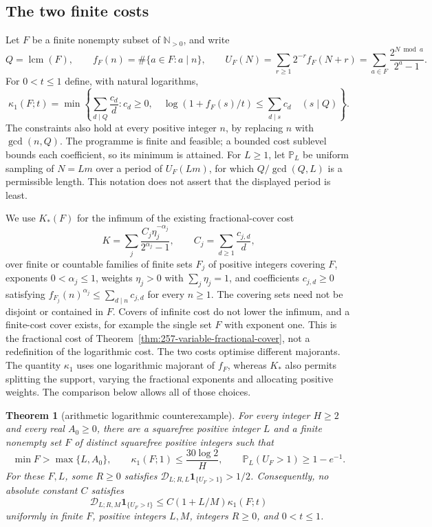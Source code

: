 \documentclass[11pt]{article}
\theoremstyle{plain}
\newtheorem{thm}{Theorem}[section]
\theoremstyle{definition}
\theoremstyle{remark}
\begin{document}
\subsection{The two finite costs}
Let $F$ be a finite nonempty subset of $\mathbb N_{>0}$, and write
\[
 Q=\operatorname{lcm}(F),\qquad f_F(n)=\#\{a\in F:a\mid n\},\qquad
 U_F(N)=\sum_{r\ge1}2^{-r}f_F(N+r)
       =\sum_{a\in F}\frac{2^{N\bmod a}}{2^a-1}.
\]
For $0<t\le1$ define, with natural logarithms,
\begin{equation}
 \kappa_1(F;t)=\min\left\{\sum_{d\mid Q}\frac{c_d}{d}:
 c_d\ge0,\quad
 \log(1+f_F(s)/t)\le\sum_{d\mid s}c_d\quad(s\mid Q)\right\}.
 \label{eq:257-logarithmic-cost}
\end{equation}
The constraints also hold at every positive integer $n$, by replacing $n$
with $\gcd(n,Q)$.  The programme is finite and feasible; a bounded cost
sublevel bounds each coefficient, so its minimum is attained.
For $L\ge1$, let $\mathbb P_L$ be uniform sampling of $N=Lm$ over a
period of $U_F(Lm)$, for which $Q/\gcd(Q,L)$ is a permissible length.
This notation does not assert that the displayed period is least.

We use $K_*(F)$ for the infimum of the existing fractional-cover cost
\begin{equation}
 K=\sum_j\frac{C_j\eta_j^{-\alpha_j}}{2^{\alpha_j}-1},\qquad
 C_j=\sum_{d\ge1}\frac{c_{j,d}}d,
 \label{eq:257-optimised-cover-cost}
\end{equation}
over finite or countable families of finite sets $F_j$ of positive integers covering
$F$, exponents $0<\alpha_j\le1$, weights $\eta_j>0$ with
$\sum_j\eta_j=1$, and coefficients $c_{j,d}\ge0$ satisfying
$f_{F_j}(n)^{\alpha_j}\le\sum_{d\mid n}c_{j,d}$ for every $n\ge1$.
The covering sets need not be disjoint or contained in $F$.  Covers of infinite
cost do not lower the infimum, and a finite-cost cover exists, for example
the single set $F$ with exponent one.  This is the fractional cost of
Theorem~\ref{thm:257-variable-fractional-cover},
not a redefinition of the logarithmic cost.
The two costs optimise different majorants. The quantity $\kappa_1$
uses one logarithmic majorant of $f_F$, whereas $K_*$ also permits
splitting the support, varying the fractional exponents and allocating
positive weights. The comparison below allows all of those choices.

\begin{thm}[arithmetic logarithmic counterexample]\label{thm:257-logarithmic-counterexample}
For every integer $H\ge2$ and every real $A_0\ge0$, there are a
squarefree positive integer $L$ and a finite nonempty set $F$ of distinct
squarefree positive integers such that
\[
 \min F>\max\{L,A_0\},\qquad
 \kappa_1(F;1)\le\frac{30\log2}{H},\qquad
 \mathbb P_L(U_F>1)\ge1-e^{-1}.
\]
For these $F,L$, some $R\ge0$ satisfies
$\mathscr D_{L;R,L}\mathbf1_{\{U_F>1\}}>1/2$.
Consequently, no absolute constant $C$ satisfies
\begin{equation*}
 \mathscr D_{L;R,M}\mathbf1_{\{U_F>t\}}
 \le C(1+L/M)\kappa_1(F;t)
 \tag{E}
\end{equation*}
uniformly in finite $F$, positive integers $L,M$, integers $R\ge0$,
and $0<t\le1$.
\end{thm}
\end{document}
